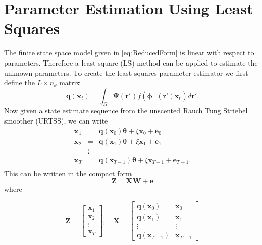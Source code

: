 \documentclass[twocolumn,11pt,a4paper]{article}		%
\begin{document}
\section{Parameter Estimation Using Least Squares}\label{App:LeastSquaresAppendix} 
The finite state space model given in \ref{eq:ReducedForm} is linear with respect to parameters. Therefore a least square (LS) method can be applied to estimate the unknown parameters. To create the least squares parameter estimator we first define the $L \times n_{\theta}$ matrix
\begin{equation}
	\mathbf{q}(\mathbf{x}_t) = \int_\Omega \boldsymbol{\Psi}(\mathbf{r}') f(\boldsymbol{\phi}^{\top}(\mathbf{r}')\mathbf{x}_t) d\mathbf{r}'.
\end{equation}
Now given a state estimate sequence from the unscented Rauch Tung Striebel smoother (URTSS), we can write
\begin{eqnarray}
	\mathbf x_{1} &=& \mathbf{q}(\mathbf x_0) \boldsymbol{\theta}+\xi\mathbf x_0+\mathbf e_0 \nonumber \\
	\mathbf x_{2} &=& \mathbf{q}(\mathbf x_1) \boldsymbol{\theta}+\xi\mathbf x_1+\mathbf e_1 \nonumber \\
	&\vdots& \\
	\mathbf x_{T}&=&\mathbf{q}(\mathbf x_{T-1}) \boldsymbol{\theta}+\xi\mathbf x_{T-1}+\mathbf e_{T-1}. \nonumber \\
\end{eqnarray}
This can be written in the compact form
\begin{equation}
	\mathbf Z=\mathbf X \mathbf W+\mathbf{e} 
\end{equation}
where
\begin{small}
\begin{equation*}
	\mathbf Z=\left[
	\begin{array}{cccc}
		\mathbf x_{1}\\
		\mathbf x_{2}\\
		\vdots\\
		\mathbf x_{T}
	\end{array}
	\right],\quad \mathbf X=\left[
	\begin{array}{cccc}
		\mathbf q(\mathbf x_0)& \mathbf x_{0}\\
		\mathbf q(\mathbf x_1)& \mathbf x_{1}\\
		\vdots & \vdots\\
		\mathbf q(\mathbf x_{T-1})& \mathbf x_{T-1}
	\end{array}
	\right] 
\end{equation*}
\end{small}
\end{document}
